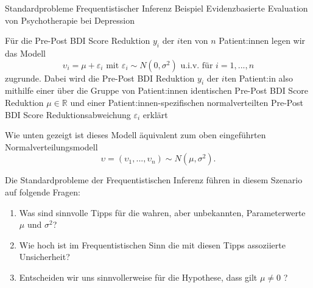 \documentclass[
  8pt,
  ignorenonframetext,
]{beamer}
\providecommand{\tightlist}{%
  \setlength{\itemsep}{0pt}\setlength{\parskip}{0pt}}
\newcommand{\ups}{\upsilon}
\begin{document}
\begin{frame}[t]{Standardprobleme Frequentistischer Inferenz}
\protect\hypertarget{standardprobleme-frequentistischer-inferenz-5}{}
Beispiel \textbar{} Evidenzbasierte Evaluation von Psychotherapie bei
Depression \vspace{2mm}

\small

Für die Pre-Post BDI Score Reduktion \(y_i\) der \(i\)ten von \(n\)
Patient:innen legen wir das Modell \begin{equation}
\ups_{i} = \mu + \varepsilon_{i} \mbox{ mit } \varepsilon_{i} \sim N(0,\sigma^2) \mbox{ u.i.v. für } i = 1,...,n
\end{equation} zugrunde. Dabei wird die Pre-Post BDI Reduktion \(y_i\)
der \(i\)ten Patient:in also mithilfe einer über die Gruppe von
Patient:innen identischen Pre-Post BDI Score Reduktion
\(\mu \in \mathbb{R}\) und einer Patient:innen-spezifischen
normalverteilten Pre-Post BDI Score Reduktionsabweichung
\(\varepsilon_{i}\) erklärt

Wie unten gezeigt ist dieses Modell äquivalent zum oben eingeführten
Normalverteilungsmodell \begin{equation}
\ups = (\ups_1,...,\ups_n) \sim N(\mu,\sigma^2).
\end{equation}

Die Standardprobleme der Frequentistischen Inferenz führen in diesem
Szenario auf folgende Fragen:

\begin{enumerate}
[(1)]
\tightlist
\item
  Was sind sinnvolle Tipps für die wahren, aber unbekannten,
  Parameterwerte \(\mu\) und \(\sigma^2\)?
\item
  Wie hoch ist im Frequentistischen Sinn die mit diesen Tipps
  assoziierte Unsicherheit?
\item
  Entscheiden wir uns sinnvollerweise für die Hypothese, dass gilt
  \(\mu\neq 0\) ?
\end{enumerate}
\end{frame}
\end{document}
